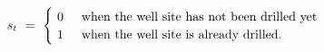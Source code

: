 \begin{equation}
    s_{t} \ = \ 
    \begin{cases}
        \ 0 \hspace{0.5cm} \text{when the well site has not been drilled yet} \\
        \ 1 \hspace{0.5cm} \text{when the well site is already drilled.}
    \end{cases}
\label{Equation:DCDP-Model_State-Variable}
\end{equation}